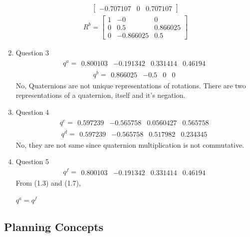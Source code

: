 \documentclass[paper=a4, fontsize=11pt]{scrartcl} %
\numberwithin{equation}{section} %
\numberwithin{figure}{section} %
\numberwithin{table}{section} %
\begin{document}
\begin{enumerate}
\begin{align}
\begin{bmatrix}
-0.707107 &0  &0.707107
\end{bmatrix}
\end{align}
\begin{align}
R^{b} = 
\begin{bmatrix}
1        &-0         &0 \\
0       &0.5  &0.866025 \\
0 &-0.866025       &0.5
\end{bmatrix}
\end{align}
\item Question 3
\begin{align}
q^{a} = 
\begin{matrix}
0.800103 &-0.191342 &0.331414 &0.46194
\end{matrix}
\end{align}
\begin{align}
q^{b} = 
\begin{matrix}
0.866025 &-0.5 &0 &0
\end{matrix}
\end{align}
No, Quaternions are not unique representations of rotations. There are two representations of a quaternion, itself and it's negation.
\item Question 4
\begin{align}
q^{c} = 
\begin{matrix}
0.597239 &-0.565758 &0.0560427 &0.565758
\end{matrix}
\end{align}
\begin{align}
q^{d} = 
\begin{matrix}
0.597239 &-0.565758 &0.517982 &0.234345
\end{matrix}
\end{align}
No, they are not same since quaternion multiplication is not commutative.
\item Question 5
\begin{align}
q^{f} = 
\begin{matrix}
0.800103 &-0.191342 &0.331414 &0.46194
\end{matrix}
\end{align}
From (1.3) and (1.7),
\begin{center}$q^{a} = q^{f}$\end{center}

\end{enumerate}
\pagebreak


\subsection{Planning Concepts}
\end{document}

